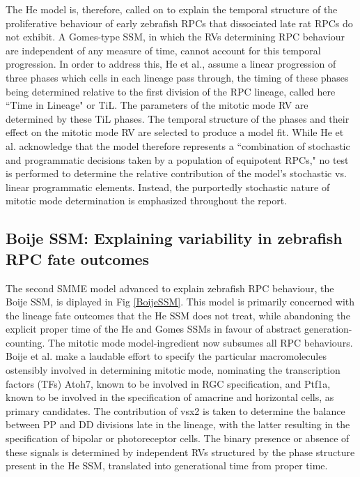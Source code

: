 \documentclass{ut-thesis}
\begin{document}
\begin{NoHyper}
The He model is, therefore, called on to explain the temporal structure of the proliferative behaviour of early zebrafish RPCs that dissociated late rat RPCs do not exhibit. A Gomes-type SSM, in which the RVs determining RPC behaviour are independent of any measure of time, cannot account for this temporal progression. In order to address this, He et al., assume a linear progression of three phases which cells in each lineage pass through, the timing of these phases being determined relative to the first division of the RPC lineage, called here ``Time in Lineage" or TiL. The parameters of the mitotic mode RV are determined by these TiL phases. The temporal structure of the phases and their effect on the mitotic mode RV are selected to produce a model fit. While He et al. acknowledge that the model therefore represents a ``combination of stochastic and programmatic decisions taken by a population of equipotent RPCs," no test is performed to determine the relative contribution of the model's stochastic vs. linear programmatic elements. Instead, the purportedly stochastic nature of mitotic mode determination is emphasized throughout the report.

 \subsection{Boije SSM: Explaining variability in zebrafish RPC fate outcomes}

The second SMME model advanced to explain zebrafish RPC behaviour, the Boije SSM, is diplayed in Fig \ref{BoijeSSM}. This model is primarily concerned with the lineage fate outcomes that the He SSM does not treat, while abandoning the explicit proper time of the He and Gomes SSMs in favour of abstract generation-counting. The mitotic mode model-ingredient now subsumes all RPC behaviours. Boije et al. make a laudable effort to specify the particular macromolecules ostensibly involved in determining mitotic mode, nominating the transcription factors (TFs) Atoh7, known to be involved in RGC specification, and Ptf1a, known to be involved in the specification of amacrine and horizontal cells, as primary candidates. The contribution of vsx2 is taken to determine the balance between PP and DD divisions late in the lineage, with the latter resulting in the specification of bipolar or photoreceptor cells. The binary presence or absence of these signals is determined by independent RVs structured by the phase structure present in the He SSM, translated into generational time from proper time.


\end{NoHyper}
\end{document}
